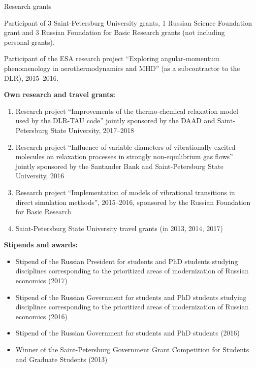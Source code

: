 \documentclass{resume} %
\begin{document}
\begin{rSection}{Research grants}

Participant of 3 Saint-Petersburg University grants, 1 Russian Science Foundation grant and 3 Russian Foundation for Basic Research grants (not including personal grants).

Participant of the ESA research project ``Exploring angular-momentum phenomenology in aerothermodynamics and MHD'' (as a subcontractor to the DLR), 2015--2016.

{\bf Own research and travel grants:}

\begin{enumerate}

    \item Research project ``Improvements of the thermo-chemical relaxation model used by the DLR-TAU code'' jointly sponsored by the DAAD and Saint-Petersburg State University, 2017--2018
    \item Research project ``Influence of variable diameters of vibrationally excited molecules on relaxation processes in strongly non-equilibrium gas flows'' jointly sponsored by the Santander Bank and Saint-Petersburg State University, 2016
    \item Research project ``Implementation of models of vibrational transitions in direct simulation methods'', 2015--2016, sponsored by the Russian Foundation for Basic Research
    \item Saint-Petersburg State University travel grants (in 2013, 2014, 2017)

\end{enumerate}

{\bf Stipends and awards:}
\begin{itemize}
    \item Stipend of the Russian President for students and PhD students studying disciplines corresponding to the prioritized areas of modernization of Russian economics (2017)
    \item Stipend of the Russian Government for students and PhD students studying disciplines corresponding to the prioritized areas of modernization of Russian economics (2016)
    \item Stipend of the Russian Government for students and PhD students (2016)
    \item Winner of the Saint-Petersburg Government Grant Competition for Students and Graduate Students (2013)
\end{itemize}
\end{rSection}
\end{document}
